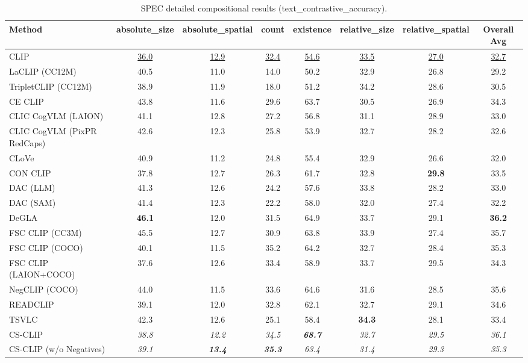 \begin{table}[t]
  \centering
  \scriptsize
  \caption{SPEC detailed compositional results (text_contrastive_accuracy).}
  \label{tab:SPEC_detailed}
  \begin{adjustbox}{max width=\textwidth}
  \setlength{\tabcolsep}{2pt}
  \begin{tabular}{p{5cm}c|c|c|c|c|c|c}
    \toprule
    Method & absolute\_size & absolute\_spatial & count & existence & relative\_size & relative\_spatial & Overall Avg \\
    \midrule
    CLIP & \underline{36.0} & \underline{12.9} & \underline{32.4} & \underline{54.6} & \underline{33.5} & \underline{27.0} & \underline{32.7} \\
    \midrule
    LaCLIP (CC12M) & 40.5 & 11.0 & 14.0 & 50.2 & 32.9 & 26.8 & 29.2 \\
    TripletCLIP (CC12M) & 38.9 & 11.9 & 18.0 & 51.2 & 34.2 & 28.6 & 30.5 \\
    \midrule
    CE CLIP & 43.8 & 11.6 & 29.6 & 63.7 & 30.5 & 26.9 & 34.3 \\
    CLIC CogVLM (LAION) & 41.1 & 12.8 & 27.2 & 56.8 & 31.1 & 28.9 & 33.0 \\
    CLIC CogVLM (PixPR RedCaps) & 42.6 & 12.3 & 25.8 & 53.9 & 32.7 & 28.2 & 32.6 \\
    CLoVe & 40.9 & 11.2 & 24.8 & 55.4 & 32.9 & 26.6 & 32.0 \\
    CON CLIP & 37.8 & 12.7 & 26.3 & 61.7 & 32.8 & \textbf{29.8} & 33.5 \\
    DAC (LLM) & 41.3 & 12.6 & 24.2 & 57.6 & 33.8 & 28.2 & 33.0 \\
    DAC (SAM) & 41.4 & 12.3 & 22.2 & 58.0 & 32.0 & 27.4 & 32.2 \\
    DeGLA & \textbf{46.1} & 12.0 & 31.5 & 64.9 & 33.7 & 29.1 & \textbf{36.2} \\
    FSC CLIP (CC3M) & 45.5 & 12.7 & 30.9 & 63.8 & 33.9 & 27.4 & 35.7 \\
    FSC CLIP (COCO) & 40.1 & 11.5 & 35.2 & 64.2 & 32.7 & 28.4 & 35.3 \\
    FSC CLIP (LAION+COCO) & 37.6 & 12.6 & 33.4 & 58.9 & 33.7 & 29.5 & 34.3 \\
    NegCLIP (COCO) & 44.0 & 11.5 & 33.6 & 64.6 & 31.6 & 28.5 & 35.6 \\
    READCLIP & 39.1 & 12.0 & 32.8 & 62.1 & 32.7 & 29.1 & 34.6 \\
    TSVLC & 42.3 & 12.6 & 25.1 & 58.4 & \textbf{34.3} & 28.1 & 33.4 \\
    \midrule
    CS-CLIP & \emph{38.8} & \emph{12.2} & \emph{34.5} & \emph{\textbf{68.7}} & \emph{32.7} & \emph{29.5} & \emph{36.1} \\
    CS-CLIP (w/o Negatives) & \emph{39.1} & \emph{\textbf{13.4}} & \emph{\textbf{35.3}} & \emph{63.4} & \emph{31.4} & \emph{29.3} & \emph{35.3} \\
    \bottomrule
  \end{tabular}
  \end{adjustbox}
\end{table}
